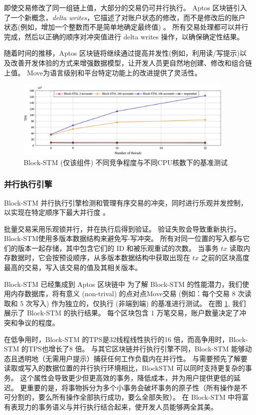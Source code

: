 \documentclass{article}
\begin{document}
即使交易修改了同一组链上值，大部分的交易仍可并行执行。 Aptos 区块链引入了一个新概念，\emph{delta writes}，它描述了对账户状态的修改，而不是修改后的账户状态(例如，增加一个整数而不是简单地确定最终值) 。 所有交易处理都可以并行完成，然后以正确的顺序对冲突值进行 delta writes 操作，以确保确定性结果。

随着时间的推移，Aptos 区块链将继续通过提高并发性(例如，利用读/写提示)以及改善开发体验的方式来增强数据模型，让开发人员更自然地创建、修改和组合链上值。 Move为语言级别和平台特定功能上的改进提供了灵活性。

\begin{figure}
\centering
\includegraphics[width=0.95\textwidth]{perf.jpg}
\caption{\label{fig:perf}Block-STM (仅该组件) 不同竞争程度与不同CPU核数下的基准测试}
\end{figure}

\subsubsection{并行执行引擎}

Block-STM 并行执行引擎检测和管理有序交易的冲突，同时进行乐观并发控制，以实现在特定顺序下最大并行度 \cite{block_stm}。

批量交易采用乐观锁并行，并在执行后得到验证。 验证失败会导致重新执行。 Block-STM使用多版本数据结构来避免写-写冲突。 所有对同一位置的写入都与它们的版本一起存储，其中包含它们的 ID 和被乐观重试的次数。 当事务 $tx$ 读取内存数据时，它会按预设顺序，从多版本数据结构中获取出现在 $tx$ 之前的区块高度最高的交易，写入该交易的值及其相关版本。

Block-STM 已经集成到 Aptos 区块链中 为了解 Block-STM 的性能潜力，我们使用内存数据库，将有意义 (non-trival) 的点对点Move交易 (例如：每个交易 8 次读取和 5 次写入) 作为独立的，仅执行 (非端到端) 的基准进行测试。 在图 \ref{fig:perf}, 我们展示了 Block-STM 的执行结果。 每个区块包含 1 万笔交易，账户数量决定了冲突和争议的程度。

在低争用时，Block-STM 的TPS是32线程线性执行的16 倍，而高争用时，Block-STM 的TPS也增长了8 倍。 与其它区块链并行执行引擎不同，Block-STM 能够动态且透明地（无需用户提示）捕获任何工作负载内在并行性。 与需要预先了解要读取或写入的数据位置的并行执行环境相比，BlockSTM 可以同时支持更复杂的事务。 这个属性会导致更少但更高效的事务，降低成本，并为用户提供更低的延迟。 更重要的是，将事物拆分为多个小事务会破坏事务的原子性（所有操作是不可分割的，要么所有操作全部执行成功，要么全部失败）。 在 Block-STM 中将富有表现力的事务语义与并行执行结合起来，使开发人员能够两全其美。
\end{document}
